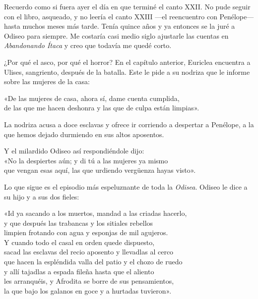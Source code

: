 \label{cap:ninas}

Recuerdo como si fuera ayer el día en que terminé el canto XXII. No pude seguir con el libro, asqueado, y no leería el canto XXIII ---el reencuentro con Penélope--- hasta muchos meses más tarde. Tenía quince años y ya entonces se la juré a Odiseo para siempre. Me costaría casi medio siglo ajustarle las cuentas en \emph{Abandonando Ítaca} y creo que todavía me quedé corto.

¿Por qué el asco, por qué el horror? En el capítulo anterior, Euriclea encuentra a Ulises, sangriento, después de la batalla. Este le pide a su nodriza que le informe sobre las mujeres de la casa:

\begin{versocita}
«De las mujeres de casa, ahora sí, dame cuenta cumplida,\\
de las que me hacen deshonra y las que de culpa están limpias».
\end{versocita}

La nodriza acusa a doce esclavas y ofrece ir corriendo a despertar a Penélope, a la que hemos dejado durmiendo en sus altos aposentos.

\begin{versocita}
Y el milardido Odiseo así respondiéndole dijo:\\
«No la despiertes aún; y di tú a las mujeres ya mismo\\
que vengan esas aquí, las que urdiendo vergüenza hayas visto».
\end{versocita}

Lo que sigue es el episodio más espeluznante de toda la \emph{Odisea}. Odiseo le dice a su hijo y a sus dos fieles:

\begin{versocita}
«Id ya sacando a los muertos, mandad a las criadas hacerlo,\\
y que después las trabancas y los sitiales rebellos\\
limpien frotando con agua y esponjas de mil agujeros.\\
Y cuando todo el casal en orden quede dispuesto,\\
sacad las esclavas del recio aposento y llevadlas al cerco\\
que hacen la espléndida valla del patio y el chozo de ruedo\\
y allí tajadlas a espada fileña hasta que el aliento\\
les arranquéis, y Afrodita se borre de sus pensamientos,\\
la que bajo los galanos en goce y a hurtadas tuvieron».
\end{versocita}


